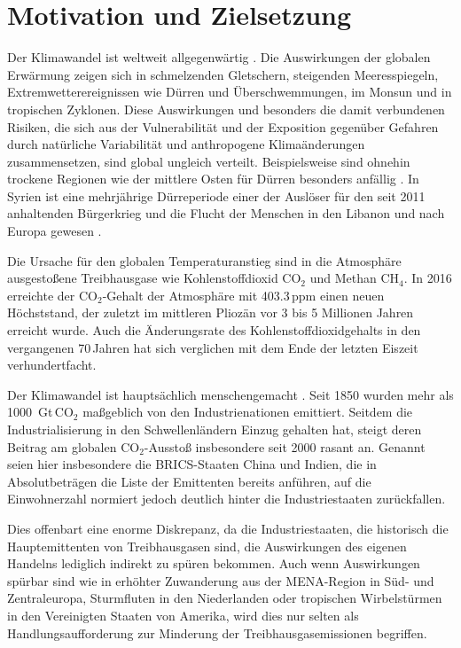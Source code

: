 \chapter{Motivation und Zielsetzung} \label{ch:motivation}

Der Klimawandel ist weltweit allgegenwärtig \citep{ipcc-2014}. Die Auswirkungen der globalen Erwärmung zeigen sich in schmelzenden Gletschern, steigenden Meeresspiegeln, Extremwetterereignissen wie Dürren und Überschwemmungen, im Monsun und in tropischen Zyklonen. Diese Auswirkungen und besonders die damit verbundenen Risiken, die sich aus der Vulnerabilität und der Exposition gegenüber Gefahren durch natürliche Variabilität und anthropogene Klimaänderungen zusammensetzen, sind global ungleich verteilt. Beispielsweise sind ohnehin trockene Regionen wie der mittlere Osten für Dürren besonders anfällig \citep{ipcc-wg2-2014}. In Syrien ist eine mehrjährige Dürreperiode einer der Auslöser für den seit 2011 anhaltenden Bürgerkrieg und die Flucht der Menschen in den Libanon und nach Europa gewesen \citep{gleick-2014}.

Die Ursache für den globalen Temperaturanstieg sind in die Atmosphäre ausgestoßene Treibhausgase wie Kohlenstoffdioxid CO$_2$ und Methan CH$_4$. In 2016 erreichte der CO$_2$-Gehalt der Atmosphäre mit \num{403.3}\,ppm einen neuen Höchststand, der zuletzt im mittleren Pliozän vor 3 bis 5 Millionen Jahren erreicht wurde. Auch die Änderungsrate des Kohlenstoffdioxidgehalts in den vergangenen \num{70}\,Jahren hat sich verglichen mit dem Ende der letzten Eiszeit verhundertfacht. \citep{wmo-ghg-2017} 

Der Klimawandel ist hauptsächlich menschengemacht \citep{ipcc-wg1-2013}. Seit 1850 wurden mehr als \SI{1000}{\giga\tonne}\,CO$_2$ maßgeblich von den Industrienationen emittiert. Seitdem die Industrialisierung in den Schwellenländern Einzug gehalten hat, steigt deren Beitrag am globalen CO$_2$-Ausstoß insbesondere seit 2000 rasant an. Genannt seien hier insbesondere die BRICS-Staaten China und Indien, die in Absolutbeträgen die Liste der Emittenten bereits anführen, auf die Einwohnerzahl normiert jedoch deutlich hinter die Industriestaaten zurückfallen. \citep{ipcc-wg3-2014}

Dies offenbart eine enorme Diskrepanz, da die Industriestaaten, die historisch die Hauptemittenten von Treibhausgasen sind, die Auswirkungen des eigenen Handelns lediglich indirekt zu spüren bekommen. Auch wenn Auswirkungen spürbar sind wie in erhöhter Zuwanderung aus der MENA-Region in Süd- und Zentraleuropa, Sturmfluten in den Niederlanden oder tropischen Wirbelstürmen in den Vereinigten Staaten von Amerika, wird dies nur selten als Handlungsaufforderung zur Minderung der Treibhausgas\-emissionen begriffen. %

